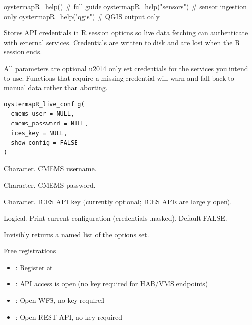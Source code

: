 \documentclass[a4paper]{book}
\begin{document}
%
\begin{Examples}
\begin{ExampleCode}
oystermapR_help()                  # full guide
oystermapR_help("sensors")         # sensor ingestion only
oystermapR_help("qgis")            # QGIS output only
\end{ExampleCode}
\end{Examples}
%
\begin{Description}
Stores API credentials in R session options so live data fetching can
authenticate with external services. Credentials are  written to
disk and are lost when the R session ends.

All parameters are optional \bsl{}u2014 only set credentials for the services you
intend to use. Functions that require a missing credential will warn
and fall back to manual data rather than aborting.
\end{Description}
%
\begin{Usage}
\begin{verbatim}
oystermapR_live_config(
  cmems_user = NULL,
  cmems_password = NULL,
  ices_key = NULL,
  show_config = FALSE
)
\end{verbatim}
\end{Usage}
%
\begin{Arguments}
\begin{ldescription}
\item[\code{cmems\_user}] Character. CMEMS username.

\item[\code{cmems\_password}] Character. CMEMS password.

\item[\code{ices\_key}] Character. ICES API key (currently optional; ICES APIs are
largely open).

\item[\code{show\_config}] Logical. Print current configuration (credentials masked).
Default FALSE.
\end{ldescription}
\end{Arguments}
%
\begin{Value}
Invisibly returns a named list of the options set.
\end{Value}
%
\begin{Section}{Free registrations}

\begin{itemize}

\item{} : Register at 
\item{} : API access is open (no key required for HAB/VMS endpoints)
\item{} : Open WFS, no key required
\item{} : Open REST API, no key required

\end{itemize}

\end{Section}
\end{document}

